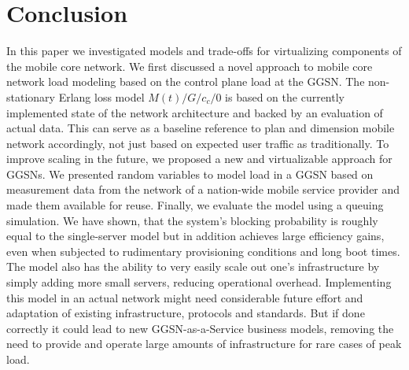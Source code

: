 \section{Conclusion}
\label{sec:conclusion}
In this paper we investigated models and trade-offs for virtualizing components of the mobile core network.
We first discussed a novel approach to mobile core network load modeling based on the control plane load at the \gls{GGSN}. The non-stationary Erlang loss model $M(t)/G/c_c/0$ is based on the currently implemented state of the network architecture and backed by an evaluation of actual data. This can serve as a baseline reference to plan and dimension mobile network accordingly, not just based on expected user traffic as traditionally.
To improve scaling in the future, we proposed a new and virtualizable approach for \glspl{GGSN}.
We presented random variables to model load in a \gls{GGSN} based on measurement data from the network of a nation-wide mobile service provider and made them available for reuse.
Finally, we evaluate the model using a queuing simulation. We have shown, that the system's blocking probability is roughly equal to the single-server model but in addition achieves large efficiency gains, even when subjected to rudimentary provisioning conditions and long boot times.
The model also has the ability to very easily scale out one's infrastructure by simply adding more small servers, reducing operational overhead.
Implementing this model in an actual network might need considerable future effort and adaptation of existing infrastructure, protocols and standards. But if done correctly it could lead to new GGSN-as-a-Service business models, removing the need to provide and operate large amounts of infrastructure for rare cases of peak load. 

